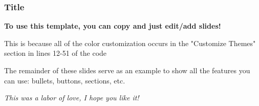 \documentclass[
    11pt, %
    aspectratio=169, %
]{beamer}
\begin{document}
\begin{frame}
	\frametitle{Title}
            \begin{center}
                \textbf{To use this template, you can copy and just edit/add slides!}\newline   
            \end{center}
            
            This is because all of the color customization occurs in the "Customize Themes" section in lines 12-51 of the code\newline

            The remainder of these slides serve as an example to show all the features you can use: bullets, buttons, sections, etc.

            \begin{center}
                \emph{This was a labor of love, I hope you like it!}
            \end{center}
\end{frame}
\end{document}

